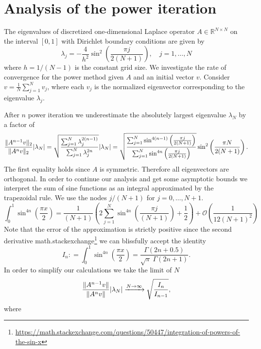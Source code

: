 \documentclass{scrartcl}
\newcommand{\defneq}{\mathrel{\mathop:}=}
\DeclarePairedDelimiter\abs{\lvert}{\rvert}%
\DeclarePairedDelimiter\norm{\lVert}{\rVert}%
\begin{document}
\section{Analysis of the power iteration}
The eigenvalues of discretized one-dimensional Laplace operator $A\in\mathbb{R}^{N\times N}$ on the interval $[0,1]$ with Dirichlet boundary conditions are given by
\[\lambda_j = -\frac{4}{h^2} \sin^2\left(\frac{\pi j}{2(N+1)}\right) ,\quad j=1,\dots, N\]
where $h = 1/(N-1)$ is the constant grid size. 
We investigate the rate of convergence for the power method given $A$ and an initial vector $v$. Consider $v=\frac{1}{N}\sum_{j=1}^N v_{j}$, where each $v_j$ is the normalized eigenvector corresponding to the eigenvalue $\lambda_j$.

After $n$ power iteration we underestimate the absolutely largest eigenvalue $\lambda_N$ by a factor of
\[
	\frac{\norm{A^{n-1}v}_2}{\norm{A^nv}_2}\abs{\lambda_N} = 
	\sqrt{\frac{\sum_{j=1}^{N}{\lambda_j^{2(n-1)}}}{\sum_{j=1}^{N}{\lambda_j^{2n}}}}\abs{\lambda_N} = 
	\sqrt{\frac{\sum_{j=1}^{N}\sin^{4(n-1)}
			\left(\frac{\pi j}{2(N+1)}\right)}{\sum_{j=1}^{N}\sin^{4n}
			\left(\frac{\pi j}{2(N+1)}\right)}}\sin^2\left(\frac{\pi N}{2(N+1)}\right).
\] 
The first equality holds since $A$ is symmetric. Therefore all eigenvectors are orthogonal. In order to continue our analysis and get some asymptotic bounds we interpret the sum of sine functions as an integral approximated by the trapezoidal rule. We use the nodes $j/(N+1)$ for $j=0,\dots,{N+1}$.
\[
	\int_{0}^{1}{\sin^{4n}\left(\frac{\pi x}{2}\right)} =
	\frac{1}{(N+1)}\left(2\sum_{j=1}^{N}\sin^{4n}\left(\frac{\pi j}{(N+1)}\right) + \frac{1}{2}\right)
	+ \mathcal{O}\left(\frac{1}{12(N+1)^2}\right)
\]
Note that the error of the approximation is strictly positive since the second derivative  math.stackexchange\footnote{\url{https://math.stackexchange.com/questions/50447/integration-of-powers-of-the-sin-x}} we can blissfully accept the identity
\[I_n \defneq \int_{0}^{1}{\sin^{4n}\left(\frac{\pi x}{2}\right)} = \frac{\Gamma(2n+0.5)}{\sqrt{\pi}\ \Gamma(2n+1)}. \]
In order to simplify our calculations we take the limit of $N$
\[ 
	\frac{\norm{A^{n-1}v}}{\norm{A^{n}v}}\abs{\lambda_N} \xrightarrow[]{N\to\infty}
	\sqrt{\frac{I_n}{I_{n-1}}}, 
\]
where
\end{document}
